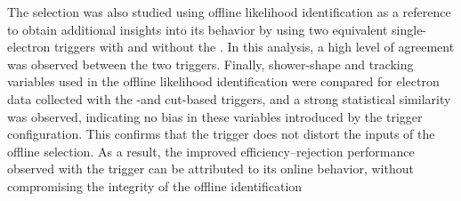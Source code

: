 The \rnn{} selection was also studied using offline likelihood identification as a reference to obtain additional insights into its behavior by using two equivalent single-electron triggers with and without the \rnn{}. 
In this analysis, a high level of agreement was observed between the two triggers. Finally, shower-shape and tracking variables used in the offline likelihood identification were compared for electron data collected with the \rnn{}-and cut-based triggers, and a strong statistical similarity was observed, indicating no bias in these variables introduced by the \rnn{} trigger configuration. This confirms that the \rnn{} trigger does not distort the inputs of the offline selection. As a result, the improved efficiency–rejection performance observed with the \rnn{} trigger can be attributed to its online behavior, without compromising the integrity of the offline identification











